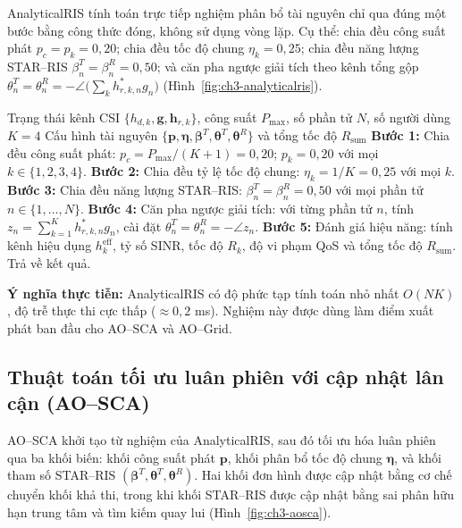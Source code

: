 AnalyticalRIS tính toán trực tiếp nghiệm phân bổ tài nguyên chỉ qua đúng một bước bằng công thức đóng, không sử
dụng vòng lặp. Cụ thể: chia đều công suất phát $p_c = p_k = 0,20$; chia đều tốc độ chung $\eta_k = 0,25$; chia đều
năng lượng STAR--RIS $\beta^T_n = \beta^R_n = 0,50$; và căn pha ngược giải tích theo kênh tổng gộp
$\theta^T_n = \theta^R_n = -\angle\big(\sum_k h^{*}_{r,k,n} g_n\big)$ (Hình~\ref{fig:ch3-analyticalris}).

\begin{algorithm}[htbp]
\caption{Phân bổ tài nguyên bằng căn pha giải tích (AnalyticalRIS)}
\label{alg:analyticalris}
\begin{algorithmic}[1]
\Require Trạng thái kênh CSI $\{h_{d,k}, \mathbf{g}, \mathbf{h}_{r,k}\}$, công suất $P_{\max}$, số phần tử $N$,
  số người dùng $K = 4$
\Ensure Cấu hình tài nguyên $\{\mathbf{p}, \boldsymbol{\eta}, \boldsymbol{\beta}^T, \boldsymbol{\theta}^T,
  \boldsymbol{\theta}^R\}$ và tổng tốc độ $R_{\mathrm{sum}}$
\State \textbf{Bước 1:} Chia đều công suất phát: $p_c = P_{\max}/(K+1) = 0,20$; $p_k = 0,20$ với mọi
  $k \in \{1, 2, 3, 4\}$.
\State \textbf{Bước 2:} Chia đều tỷ lệ tốc độ chung: $\eta_k = 1/K = 0,25$ với mọi $k$.
\State \textbf{Bước 3:} Chia đều năng lượng STAR--RIS: $\beta^T_n = \beta^R_n = 0,50$ với mọi phần tử
  $n \in \{1, \dots, N\}$.
\State \textbf{Bước 4:} Căn pha ngược giải tích: với từng phần tử $n$, tính $z_n = \sum_{k=1}^{K} h^{*}_{r,k,n}
  g_n$, cài đặt $\theta^T_n = \theta^R_n = -\angle z_n$.
\State \textbf{Bước 5:} Đánh giá hiệu năng: tính kênh hiệu dụng $h^{\mathrm{eff}}_k$, tỷ số SINR, tốc độ $R_k$,
  độ vi phạm QoS và tổng tốc độ $R_{\mathrm{sum}}$. Trả về kết quả.
\end{algorithmic}
\end{algorithm}

\textbf{Ý nghĩa thực tiễn:} AnalyticalRIS có độ phức tạp tính toán nhỏ nhất $O(NK)$, độ trễ thực thi cực thấp
($\approx 0,2$ ms). Nghiệm này được dùng làm điểm xuất phát ban đầu cho AO--SCA và AO--Grid.



\subsection{Thuật toán tối ưu luân phiên với cập nhật lân cận (AO--SCA)}
\label{ssec:ao-sca}

AO--SCA khởi tạo từ nghiệm của AnalyticalRIS, sau đó tối ưu hóa luân phiên qua ba khối biến: khối công suất phát
$\mathbf{p}$, khối phân bổ tốc độ chung $\boldsymbol{\eta}$, và khối tham số STAR--RIS $(\boldsymbol{\beta}^T,
\boldsymbol{\theta}^T, \boldsymbol{\theta}^R)$. Hai khối đơn hình được cập nhật bằng cơ chế chuyển khối khả thi,
trong khi khối STAR--RIS được cập nhật bằng sai phân hữu hạn trung tâm và tìm kiếm quay lui
(Hình~\ref{fig:ch3-aosca}).

